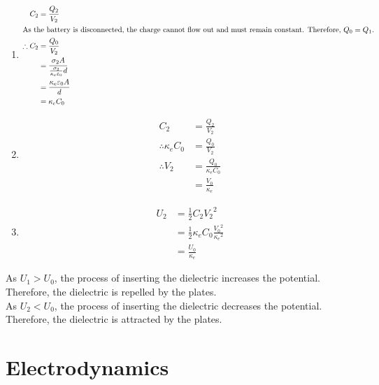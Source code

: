 \documentclass[fleqn, a4paper, 12pt, twoside]{article}
\theoremstyle{definition}
\theoremstyle{theorem}
\begin{document}
\begin{solution}
\begin{enumerate}[leftmargin = *]
		\item
			\begin{align*}
				C_2            & = \frac{Q_2}{V_2}                                              \\
				\intertext{As the battery is disconnected, the charge cannot flow out and must remain constant. Therefore, $Q_0 = Q_1$.}
				\therefore C_2 & = \frac{Q_0}{V_2}                                              \\
                                               & = \frac{\sigma_2 A}{\frac{\sigma_2}{\kappa_e \varepsilon_0} d} \\
                                               & = \frac{\kappa_e \varepsilon_0 A}{d}                           \\
                                               & = \kappa_e C_0
			\end{align*}
		\item
			\begin{align*}
				C_2                     & = \frac{Q_2}{V_2}          \\
				\therefore \kappa_e C_0 & = \frac{Q_0}{V_2}          \\
				\therefore V_2          & = \frac{Q_0}{\kappa_e C_0} \\
                                                        & = \frac{V_0}{\kappa_e}
			\end{align*}
		\item
			\begin{align*}
				U_2 & = \frac{1}{2} C_2 {V_2}^2                               \\
                                    & = \frac{1}{2} \kappa_e C_0 \frac{{V_0}^2}{{\kappa_e}^2} \\
                                    & = \frac{U_0}{\kappa_e}
			\end{align*}
	\end{enumerate}
	As $U_1 > U_0$, the process of inserting the dielectric increases the potential.
	Therefore, the dielectric is repelled by the plates.\\
	As $U_2 < U_0$, the process of inserting the dielectric decreases the potential.
	Therefore, the dielectric is attracted by the plates.
\end{solution}

\newpage
\part{Electrodynamics}
\end{document}
